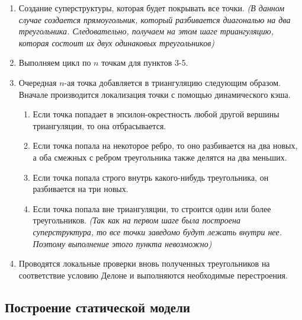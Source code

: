 \documentclass[a4paper, 12pt]{article}   	%
\begin{document}
    \begin{enumerate}
        \item Создание суперструктуры, которая будет покрывать все точки. {\it (В данном случае создается прямоугольник, который разбивается диагональю на два треугольника. Следовательно, получаем на этом шаге триангуляцию, которая состоит их двух одинаковых треугольников)}
        \item Выполняем цикл по $n$ точкам для пунктов 3-5.
        \item Очередная $n$-ая точка добавляется в триангуляцию следующим образом. Вначале производится локализация точки с помощью динамического кэша.
        \begin{enumerate}
            \item Если точка попадает в эпсилон-окрестность любой другой вершины триангуляции, то она отбрасывается.
            \item Если точка попала на некоторое ребро, то оно разбивается на два новых, а оба смежных с ребром треугольника также делятся на два меньших. 
            \item Если точка попала строго внутрь какого-нибудь треугольника, он разбивается на три новых.
            \item Если точка попала вне триангуляции, то строится один или более треугольников.  {\it (Так как на первом шаге была построена суперструктура, то все точки заведомо будут лежать внутри нее. Поэтому выполнение этого пункта невозможно)}
        \end{enumerate}
        \item Проводятся локальные проверки вновь полученных треугольников на соответствие условию Делоне и выполняются необходимые перестроения.
    \end{enumerate}

\newpage
\subsection{Построение статической модели}
\end{document}
